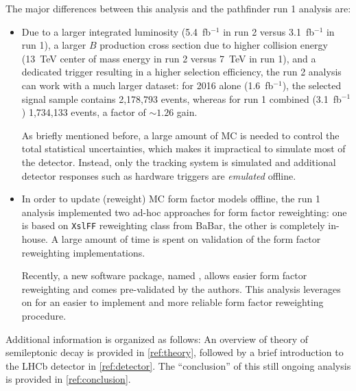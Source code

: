 The major differences between this analysis and the pathfinder run 1 \RDX
analysis are:
\begin{itemize}
    \item Due to a larger integrated luminosity
        (5.4~fb$^{-1}$ in run 2 versus 3.1~fb$^{-1}$ in run 1),
        a larger $B$ production cross section due to higher collision energy
        (13~TeV center of mass energy in run 2 versus 7~TeV in run 1),
        and a dedicated trigger resulting in a higher selection efficiency,
        the run 2 analysis can work with a much larger dataset:
        for 2016 alone (1.6~fb$^{-1}$),
        the selected \Dz\mun signal sample contains 2,178,793 events,
        whereas for run 1 combined (3.1~fb$^{-1}$) 1,734,133 events,
        a factor of $\sim\!1.26$ gain.

        As briefly mentioned before,
        a large amount of MC is needed to control the total statistical
        uncertainties,
        which makes it impractical to simulate most of the detector.
        Instead, only the tracking system is simulated and additional detector
        responses such as hardware triggers are \emph{emulated} offline.

    \item In order to update (reweight) MC form factor models offline,
        the run 1 analysis implemented two ad-hoc approaches for form factor
        reweighting:
        one is based on \texttt{XslFF} reweighting class from BaBar,
        the other is completely in-house.
        A large amount of time is spent on validation of the form factor
        reweighting implementations.

        Recently, a new software package, named \Hammer, allows easier form
        factor reweighting and comes pre-validated by the \Hammer authors.
        This analysis leverages on \Hammer for an easier to implement and more
        reliable form factor reweighting procedure.
\end{itemize}


Additional information is organized as follows:
An overview of theory of semileptonic \B decay is provided in
\cref{ref:theory},
followed by a brief introduction to the LHCb detector in \cref{ref:detector}.
The ``conclusion'' of this still ongoing analysis is provided in
\cref{ref:conclusion}.
